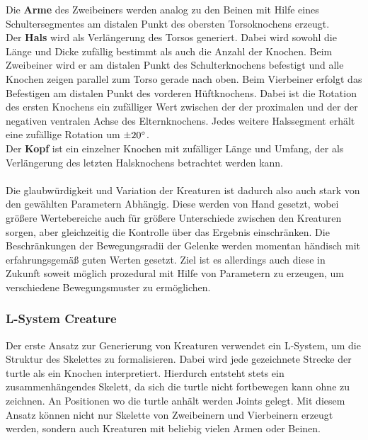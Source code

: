 Die \textbf{Arme} des Zweibeiners werden analog zu den Beinen mit Hilfe eines Schultersegmentes am distalen Punkt des obersten Torsoknochens erzeugt.\\
Der \textbf{Hals} wird als Verlängerung des Torsos generiert. Dabei wird sowohl die Länge und Dicke zufällig bestimmt als auch die Anzahl der Knochen. Beim Zweibeiner wird er am distalen Punkt des Schulterknochens befestigt und alle Knochen zeigen parallel zum Torso gerade nach oben. Beim Vierbeiner erfolgt das Befestigen am distalen Punkt des vorderen Hüftknochens. Dabei ist die Rotation des ersten Knochens ein zufälliger Wert zwischen der der proximalen und der der negativen ventralen Achse des Elternknochens. Jedes weitere Halssegment erhält eine zufällige Rotation um $\pm 20\degree$.\\
Der \textbf{Kopf} ist ein einzelner Knochen mit zufälliger Länge und Umfang, der als Verlängerung des letzten Halsknochens betrachtet werden kann.\\
\\
Die glaubwürdigkeit und Variation der Kreaturen ist dadurch also auch stark von den gewählten Parametern Abhängig. Diese werden von Hand gesetzt, wobei größere Wertebereiche auch für größere Unterschiede zwischen den Kreaturen sorgen, aber gleichzeitig die Kontrolle über das Ergebnis einschränken. Die Beschränkungen der Bewegungsradii der Gelenke werden momentan händisch mit erfahrungsgemäß guten Werten gesetzt. Ziel ist es allerdings auch diese in Zukunft soweit möglich prozedural mit Hilfe von Parametern zu erzeugen, um verschiedene Bewegungsmuster zu ermöglichen.




\subsubsection{L-System Creature}\label{L_System}
Der erste Ansatz zur Generierung von Kreaturen verwendet ein L-System, um die Struktur des Skelettes zu formalisieren.
Dabei wird jede gezeichnete Strecke der turtle als ein Knochen interpretiert.
Hierdurch entsteht stets ein zusammenhängendes Skelett, da sich die turtle nicht fortbewegen kann ohne zu zeichnen.
An Positionen wo die turtle anhält werden Joints gelegt.
Mit diesem Ansatz können nicht nur Skelette von Zweibeinern und Vierbeinern erzeugt werden, sondern auch Kreaturen mit beliebig vielen Armen oder Beinen.

